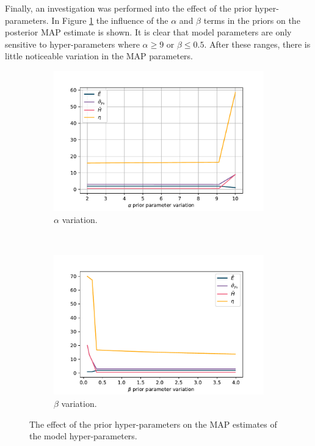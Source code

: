 \documentclass{article}
\begin{document}
	Finally, an investigation was performed into the effect of the prior hyper-parameters. In Figure \ref{fig:Q3_hyperparameter_effects} the influence of the $\alpha$ and $\beta$ terms in the priors on the posterior MAP estimate is shown. It is clear that model parameters are only sensitive to hyper-parameters where $\alpha \geq 9$ or $\beta \leq 0.5$. After these ranges, there is little noticeable variation in the MAP parameters.
	\begin{figure}[htb!]
		\centering
		\begin{subfigure}[b]{0.45\textwidth}
			\centering
			\includegraphics[width=\textwidth]{Q3a_13.pdf}
			\caption{$\alpha$ variation.}
		\end{subfigure}
		~
		\begin{subfigure}[b]{0.45\textwidth}
			\centering
			\includegraphics[width=\textwidth]{Q3a_14.pdf}
			\caption{$\beta$ variation.}
		\end{subfigure}
		
		\caption{The effect of the prior hyper-parameters on the MAP estimates of the model hyper-parameters.}
		\label{fig:Q3_hyperparameter_effects}
	\end{figure}
	
\end{document}
